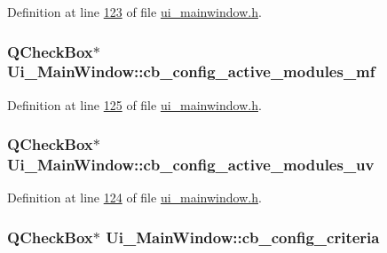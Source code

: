 Definition at line \hyperlink{a00052_source_l00123}{123} of file \hyperlink{a00052_source}{ui\+\_\+mainwindow.\+h}.

\hypertarget{a00027_abc96d02b5b7a9480a2a142008e99a100}{
\subsubsection[{cb\+\_\+config\+\_\+active\+\_\+modules\+\_\+mf}]{\setlength{\rightskip}{0pt plus 5cm}Q\+Check\+Box$\ast$ Ui\+\_\+\+Main\+Window\+::cb\+\_\+config\+\_\+active\+\_\+modules\+\_\+mf}}\label{a00027_abc96d02b5b7a9480a2a142008e99a100}


Definition at line \hyperlink{a00052_source_l00125}{125} of file \hyperlink{a00052_source}{ui\+\_\+mainwindow.\+h}.

\hypertarget{a00027_a72ad8a6b100948f9b1438cf3b949be5e}{
\subsubsection[{cb\+\_\+config\+\_\+active\+\_\+modules\+\_\+uv}]{\setlength{\rightskip}{0pt plus 5cm}Q\+Check\+Box$\ast$ Ui\+\_\+\+Main\+Window\+::cb\+\_\+config\+\_\+active\+\_\+modules\+\_\+uv}}\label{a00027_a72ad8a6b100948f9b1438cf3b949be5e}


Definition at line \hyperlink{a00052_source_l00124}{124} of file \hyperlink{a00052_source}{ui\+\_\+mainwindow.\+h}.

\hypertarget{a00027_a89574c631636929702a5928b2a159892}{
\subsubsection[{cb\+\_\+config\+\_\+criteria}]{\setlength{\rightskip}{0pt plus 5cm}Q\+Check\+Box$\ast$ Ui\+\_\+\+Main\+Window\+::cb\+\_\+config\+\_\+criteria}}\label{a00027_a89574c631636929702a5928b2a159892}


